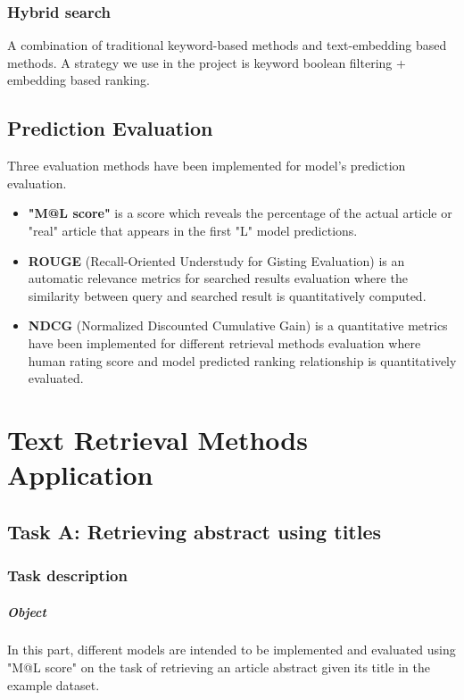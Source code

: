 \documentclass[10pt,a4paper,fleqn]{report}
\begin{document}
		\subsection{Hybrid search}
				
				A combination of traditional keyword-based methods and text-embedding based methods. 
				A strategy we use in the project is keyword boolean filtering + embedding based ranking.
				
				
	\section{Prediction Evaluation}
	
		Three evaluation methods have been implemented for model's prediction evaluation.
		
		\begin{itemize}
			\item \textbf{"M@L score"} is a score which reveals the percentage of the actual article or "real" article that appears in the first "L" model predictions.
			\item \textbf{ROUGE} (Recall-Oriented Understudy for Gisting Evaluation) is an automatic relevance metrics for searched results evaluation where the similarity between query and searched result is quantitatively computed.
			\item \textbf{NDCG} (Normalized Discounted Cumulative Gain) is a quantitative metrics have been implemented for different retrieval methods evaluation where human rating score and model predicted ranking relationship is quantitatively evaluated.
		\end{itemize}
	
\chapter{Text Retrieval Methods Application}

	\section{Task A: Retrieving abstract using titles}
		\subsection{Task description}
			
			\paragraph{Object}
			In this part, different models are intended to be implemented and evaluated using "M@L score" on the task of retrieving an article abstract given its title in the example dataset.
			
\end{document}
